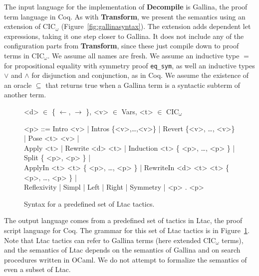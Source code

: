 The input language for the implementation of \textbf{Decompile} is Gallina, the proof term language in Coq.
As with \textbf{Transform}, we present the semantics using an extension of CIC$_{\omega}$ (Figure~\ref{fig:gallinasyntax}).
The extension adds dependent let expressions, taking it one step closer to Gallina.
It does not include any of the configuration parts from \textbf{Transform}, since these just compile down to proof terms in CIC$_{\omega}$.
We assume all names are fresh. %
We assume an inductive type $=$ for propositional equality with symmetry proof \lstinline{eq_sym},
as well an inductive types $\vee$ and $\wedge$ for disjunction and conjunction, as in Coq.
We assume the existence of an oracle $\subseteq$ that returns true when a Gallina term is a syntactic subterm of another term.

\begin{figure}
\small
\begin{grammar}
<d> $\in$ \{ $\leftarrow$, $\rightarrow$ \}, <v> $\in$ Vars, <t> $\in$ CIC$_{\omega}$

<p> ::= Intro <v> | Intros \{<v>,\ldots,<v>\} | Revert \{<v>, \ldots, <v>\} | Pose <t> <v> | \\
Apply <t> | Rewrite <d> <t> | Induction <t> \{ <p>, \ldots, <p> \} | Split \{ <p>, <p> \} | \\
ApplyIn <t> <t> \{ <p>, \ldots, <p> \} | RewriteIn <d> <t> <t> \{ <p>, \ldots, <p> \} | \\
Reflexivity | Simpl | Left | Right | Symmetry | <p> . <p>
\end{grammar}
\caption{Syntax for a predefined set of Ltac tactics.}
\label{fig:ltacsyntax}
\end{figure}

The output language comes from a predefined set of tactics in Ltac, the proof script language for Coq.
The grammar for this set of Ltac tactics is in Figure~\ref{fig:ltacsyntax}.
Note that Ltac tactics can refer to Gallina terms (here extended CIC$_{\omega}$ terms),
and the semantics of Ltac depends on the semantics of Gallina and on search procedures written in OCaml.
We do not attempt to formalize the semantics of even a subset of Ltac.

